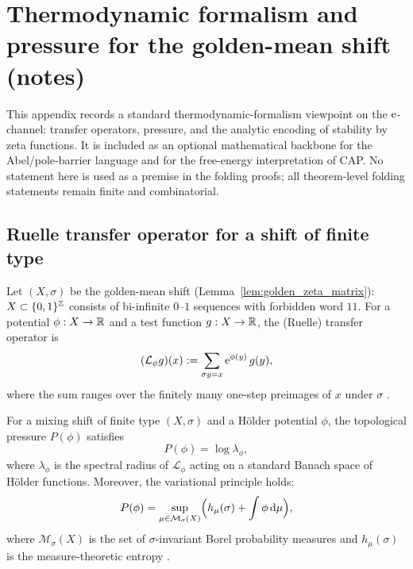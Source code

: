 \section{Thermodynamic formalism and pressure for the golden-mean shift (notes)}
\label{app:thermodynamic_formalism_pressure}

\AuditTag This appendix records a standard thermodynamic-formalism viewpoint on the $\mathrm{e}$-channel: transfer operators, pressure, and the analytic encoding of stability by zeta functions.
It is included as an optional mathematical backbone for the Abel/pole-barrier language and for the free-energy interpretation of CAP.
No statement here is used as a premise in the folding proofs; all theorem-level folding statements remain finite and combinatorial.

\subsection{Ruelle transfer operator for a shift of finite type}
\label{subsec:ruelle_transfer_operator_sft}

Let $(X,\sigma)$ be the golden-mean shift (Lemma~\ref{lem:golden_zeta_matrix}): $X\subset\{0,1\}^{\mathbb{Z}}$ consists of bi-infinite $0$--$1$ sequences with forbidden word $11$.
For a potential $\phi:X\to\mathbb{R}$ and a test function $g:X\to\mathbb{R}$, the (Ruelle) transfer operator is
\begin{equation}
\label{eq:ruelle_transfer_operator}
(\mathcal{L}_\phi g)(x):=\sum_{\sigma y=x} \mathrm{e}^{\phi(y)}\,g(y),
\end{equation}
where the sum ranges over the finitely many one-step preimages of $x$ under $\sigma$ \cite{Ruelle1978,ParryPollicott1990,LindMarcus1995}.

\begin{theorem}
\label{thm:pressure_spectral_radius_standard}
\MathTag For a mixing shift of finite type $(X,\sigma)$ and a H\"older potential $\phi$, the topological pressure $P(\phi)$ satisfies
\[
P(\phi)=\log \lambda_\phi,
\]
where $\lambda_\phi$ is the spectral radius of $\mathcal{L}_\phi$ acting on a standard Banach space of H\"older functions.
Moreover, the variational principle holds:
\[
P(\phi)=\sup_{\mu\in\mathcal{M}_\sigma(X)}\Bigl(h_\mu(\sigma)+\int \phi\,\mathrm{d}\mu\Bigr),
\]
where $\mathcal{M}_\sigma(X)$ is the set of $\sigma$-invariant Borel probability measures and $h_\mu(\sigma)$ is the measure-theoretic entropy \cite{Ruelle1978,ParryPollicott1990,LindMarcus1995}.
\end{theorem}

